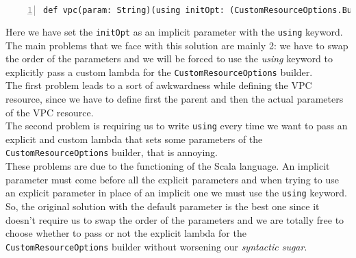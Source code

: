 \begin{minipage}{\linewidth}
\begin{lstlisting}[numbers=left, numberstyle=\tiny, numbersep=-5pt, stepnumber=1]
  def vpc(param: String)(using initOpt: (CustomResourceOptions.Builder ?=> Unit), init: VpcArgs.Builder ?=> Unit) :etc.
\end{lstlisting}
\end{minipage}
Here we have set the \texttt{initOpt} as an implicit parameter with the \texttt{using} keyword.
The main problems that we face with this solution are mainly 2: we have to swap the order of the parameters and we will be forced to use the \textit{using} keyword to explicitly pass a custom lambda for the \texttt{CustomResourceOptions} builder.\\
The first problem leads to a sort of awkwardness while defining the VPC resource, since we have to define first the parent and then the actual parameters of the VPC resource.\\
The second problem is requiring us to write \texttt{using} every time we want to pass an explicit and custom lambda that sets some parameters of the \texttt{CustomResourceOptions} builder, that is annoying.\\
These problems are due to the functioning of the Scala language.
An implicit parameter must come before all the explicit parameters and when trying to use an explicit parameter in place of an implicit one we must use the \texttt{using} keyword.
So, the original solution with the default parameter is the best one since it doesn't require us to swap the order of the parameters and we are totally free to choose whether to pass or not the explicit lambda for the \texttt{CustomResourceOptions} builder without worsening our \textit{syntactic sugar}.


